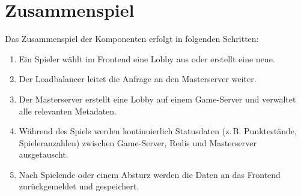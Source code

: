 \section{Zusammenspiel}
Das Zusammenspiel der Komponenten erfolgt in folgenden Schritten:
\begin{enumerate}
  \item Ein Spieler wählt im Frontend eine Lobby aus oder erstellt eine neue.
  \item Der Loadbalancer leitet die Anfrage an den Masterserver weiter.
  \item Der Masterserver erstellt eine Lobby auf einem Game-Server und verwaltet alle relevanten Metadaten.
  \item Während des Spiels werden kontinuierlich Statusdaten (z.\,B. Punktestände, Spieleranzahlen) zwischen Game-Server, Redis und Masterserver ausgetauscht.
  \item Nach Spielende oder einem Absturz werden die Daten an das Frontend zurückgemeldet und gespeichert.
\end{enumerate}